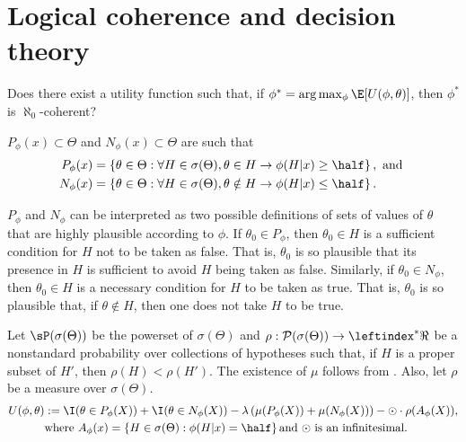 \section{Logical coherence and decision theory}


Does there exist a utility function such that,
if $\phi^* = \arg \max_{\phi} \E[U(\phi,\theta)]$,
then $\phi^*$ is $\aleph_0$-coherent?

\begin{definition}
 $P_{\phi}(x) \subset \Theta$ and
 $N_{\phi}(x) \subset \Theta$ are such that
 \label{def:region_p_n}
 \begin{align*}
  P_{\phi}(x) 
  &= \left\{\theta \in \Theta:
  \forall H \in \sigma(\Theta),
  \theta \in H \rightarrow 
  \phi(H|x) \geq \half\right\}, \text{ and } \\
  N_{\phi}(x)
  &= \left\{\theta \in \Theta:
  \forall H \in \sigma(\Theta),
  \theta \notin H \rightarrow 
  \phi(H|x) \leq \half\right\}.
 \end{align*}
\end{definition}

$P_{\phi}$ and $N_{\phi}$ can be
interpreted as two possible definitions of
sets of values of $\theta$ that are
highly plausible according to $\phi$.
If $\theta_0 \in P_{\phi}$, then
$\theta_0 \in H$ is a sufficient condition
for $H$ not to be taken as false.
That is, $\theta_0$ is so plausible that
its presence in $H$ is sufficient
to avoid $H$ being taken as false.
Similarly, if $\theta_0 \in N_{\phi}$, then
$\theta_0 \in H$ is a necessary condition for
$H$ to be taken as true.
That is, $\theta_0$ is so plausible that,
if $\theta \notin H$, then
one does not take $H$ to be true.

\begin{definition}
 \label{def:u_gfbst}
  Let $\sP(\sigma(\Theta))$ be
  the powerset of $\sigma(\Theta)$ and
  $\rho: \mathcal{P}(\sigma(\Theta))
 \rightarrow \leftindex^*{\Re}$ be
 a nonstandard probability over
 collections of hypotheses such that,
 if $H$ is a proper subset of $H'$, then
 $\rho(H) < \rho(H')$.
 The existence of $\mu$ follows from
 \citet{Schervish2022}. Also, let
 $\rho$ be a measure over $\sigma(\Theta)$.
 \begin{align*}
  U(\phi, \theta)
  &:= \I(\theta \in P_{\phi}(X))
 + \I(\theta \in N_{\phi}(X))
  -\lambda \left(\mu(P_{\phi}(X))
  +\mu(N_{\phi}(X)) \right) 
  -\odot \cdot \rho(A_{\phi}(X)), \\
  & \text{where } A_{\phi}(x) = 
  \left\{H \in \sigma(\Theta): \phi(H|x) = \half 
  \right\} \text{and $\odot$ is an infinitesimal}.
 \end{align*}
\end{definition}

